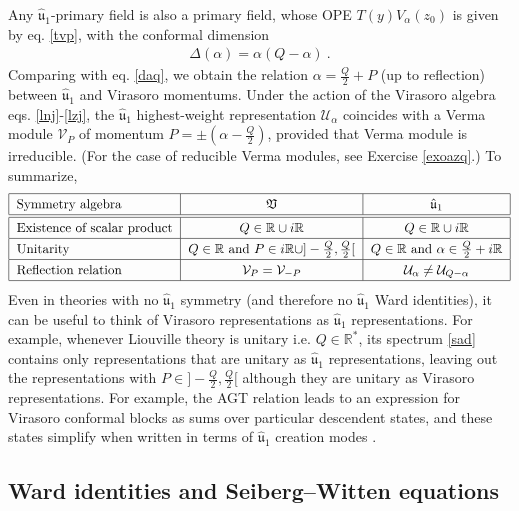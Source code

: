 \documentclass[12pt, a4paper, notitlepage, twoside]{report}
\numberwithin{equation}{section}
\theoremstyle{break}
\begin{document}
Any $\hat{\mathfrak{u}}_1$-primary field is also a primary field, whose OPE $T(y)V_\alpha(z_0)$ is given by eq. \eqref{tvp}, with the conformal dimension 
\begin{align}
 \Delta(\alpha) = \alpha(Q-\alpha)\ .
 \label{daqu}
\end{align}
Comparing with
eq. \eqref{daq}, we obtain the relation $\alpha = \frac{Q}{2}+P$ (up to reflection) between $\hat{\mathfrak{u}}_1$ and Virasoro momentums. 
Under the action of the Virasoro algebra eqs. \eqref{lnj}-\eqref{lzj}, the $\hat{\mathfrak{u}}_1$ highest-weight representation $\mathcal{U}_\alpha$ coincides with a Verma module $\mathcal{V}_P$ of momentum $P=\pm(\alpha-\frac{Q}{2})$, provided that Verma module is irreducible. (For the case of reducible Verma modules, see Exercise \ref{exoazq}.)
To summarize,
\begin{align}
\renewcommand{\arraystretch}{1.3}
 \begin{tabular}{|l|c|c|}
  \hline
 Symmetry algebra  & $\mathfrak{V}$ & $\hat{\mathfrak{u}}_1 $
\\
\hline\hline
 Existence of scalar product & $Q\in {\mathbb{R}} \cup i{\mathbb{R}} $ & $Q\in {\mathbb{R}} \cup i{\mathbb{R}}$ 
\\
\hline
 Unitarity & $Q\in\mathbb{R}$ and $P\in i{\mathbb{R}} \cup ]-\frac{Q}{2},\frac{Q}{2}[ $ &  $Q\in\mathbb{R}$ and $\alpha \in \frac{Q}{2}+i{\mathbb{R}}$
\\
\hline 
 Reflection relation  & $\mathcal{V}_P = \mathcal{V}_{-P} $ & $\mathcal{U}_\alpha \neq \mathcal{U}_{Q-\alpha} $ 
\\
\hline
 \end{tabular}
\end{align}
Even in theories with no $\hat{\mathfrak{u}}_1$ symmetry (and therefore no $\hat{\mathfrak{u}}_1$ Ward identities), 
it can be useful to think of Virasoro representations as $\hat{\mathfrak{u}}_1$ representations. 
For example,
whenever Liouville theory is unitary i.e. $Q\in\mathbb{R}^*$, its spectrum \eqref{sad} contains only representations that are unitary as $\hat{\mathfrak{u}}_1$ representations, leaving out the representations with $P\in ]-\frac{Q}{2}, \frac{Q}{2}[$ although they are unitary as Virasoro representations. 
For example, the AGT relation leads to an expression for Virasoro conformal blocks as sums over particular descendent states, and these states simplify when written in terms of $\hat{\mathfrak{u}}_1$ creation modes \cite{aflt10}.


\subsection{Ward identities and Seiberg--Witten equations}
\end{document}
